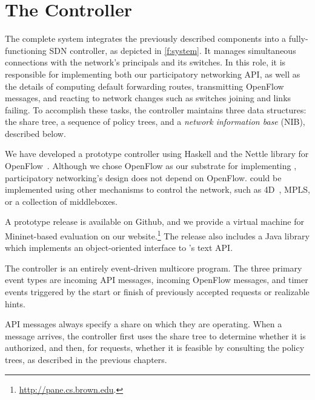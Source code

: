\chapter{The \sys Controller}
\label{sec:FullSystem}



The complete \sys system integrates the previously described
components into a fully-functioning SDN controller, as depicted in
\autoref{f:system}.  It manages simultaneous connections with the
network's principals and its switches. In this role, it is
responsible for implementing both our participatory networking API,
as well as the details of computing default forwarding routes,
transmitting OpenFlow messages, and reacting to network changes such
as switches joining and links failing.  To accomplish these tasks,
the \sys controller maintains three data structures: the share tree,
a sequence of policy trees, and a \emph{network information base}
(NIB), described below.

We have developed a prototype \sys controller using Haskell and the
Nettle library for OpenFlow~\cite{Voellmy:2011}. Although
we chose OpenFlow as our substrate for implementing \sys, participatory networking's design
does not depend on OpenFlow. \sys could be implemented using other
mechanisms to control the network, such as 4D~\cite{Greenberg:2005},
MPLS, or a collection of middleboxes.

A prototype release is available on Github, and we provide a virtual
machine for Mininet-based evaluation on our website.\footnote{\url{http://pane.cs.brown.edu}.} The release also includes a Java library
which implements an object-oriented interface to \sys's text API.

The \sys controller is an entirely event-driven multicore program.
The three primary event types are incoming \sys API messages,
incoming OpenFlow messages, and timer events triggered by the start
or finish of previously accepted requests or realizable hints.

API messages always specify a share on which they
are operating. When a message arrives, the \sys controller first
uses the share tree to determine whether it is authorized, and then,
for requests, whether it is feasible by consulting the policy
trees, as described in the previous chapters.

